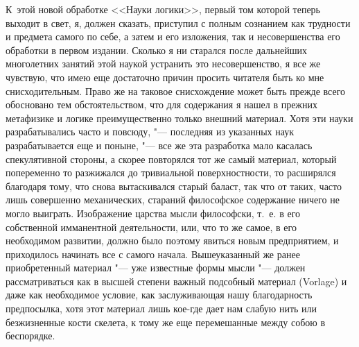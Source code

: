 К~этой новой обработке <<Науки логики>>, первый том которой теперь выходит в
свет, я, должен сказать, приступил с полным сознанием как трудности и предмета
самого по себе, а затем и его изложения, так и несовершенства его обработки в
первом издании. Сколько я ни старался после дальнейших многолетних занятий этой
наукой устранить это несовершенство, я все же чувствую, что имею еще достаточно
причин просить читателя быть ко мне снисходительным. Право же на таковое
снисхождение может быть прежде всего обосновано тем обстоятельством, что для
содержания я нашел в прежних метафизике и логике преимущественно только внешний
материал. Хотя эти науки разрабатывались часто и повсюду, "--- последняя из
указанных наук разрабатывается еще и поныне, "--- все же эта разработка мало
касалась спекулятивной стороны, а скорее повторялся тот же самый материал,
который попеременно то разжижался до тривиальной поверхностности, то расширялся
благодаря тому, что снова вытаскивался старый баласт, так что от таких, часто
лишь совершенно механических, стараний философское содержание ничего не могло
выиграть. Изображение царства мысли философски, т.~е. в его собственной
имманентной деятельности, или, что то же самое, в его необходимом развитии,
должно было поэтому явиться новым предприятием, и приходилось начинать все с
самого начала. Вышеуказанный же ранее приобретенный материал "--- уже известные
формы мысли "--- должен рассматриваться как в высшей степени важный подсобный
материал (Vorlage) и даже как необходимое условие, как заслуживающая нашу
благодарность предпосылка, хотя этот материал лишь кое-где дает нам слабую нить
или безжизненные кости скелета, к тому же еще перемешанные между собою в
беспорядке.

